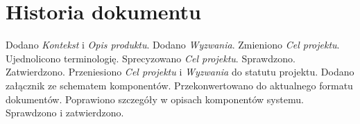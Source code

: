 \documentclass[10pt]{dokument-ppi}
\begin{document}
\newpage
\section*{Historia dokumentu}
\begin{versions}
        Dodano \emph{Kontekst} i \emph{Opis produktu}.
        Dodano \emph{Wyzwania}.
        Zmieniono \emph{Cel projektu}.
        Ujednolicono terminologię. Sprecyzowano \emph{Cel projektu}.
        Sprawdzono.
        Zatwierdzono.
        Przeniesiono \emph{Cel projektu} i \emph{Wyzwania} do statutu projektu.
        Dodano załącznik ze schematem komponentów.
        Przekonwertowano do aktualnego formatu dokumentów.
        Poprawiono szczegóły w opisach komponentów systemu.
        Sprawdzono i zatwierdzono.
\end{versions}
\end{document}
